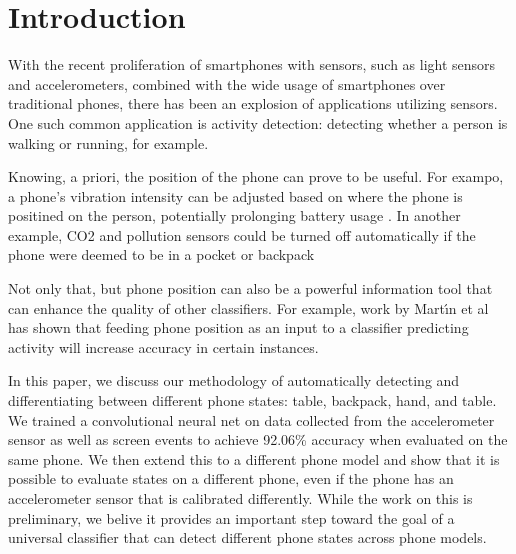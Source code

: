 \section{Introduction}
With the recent proliferation of smartphones with sensors, such as light sensors and accelerometers,
 combined with the wide usage of smartphones over traditional phones, 
 there has been an explosion of applications utilizing sensors.
One such common application is activity detection: detecting whether a person is walking or running, for example.

Knowing, a priori, the position of the phone can prove to be useful.
For exampo, a phone's vibration intensity can be adjusted based on where the phone is positined on the person, potentially prolonging battery usage \cite{Fujinami}.
In another example, CO2 and pollution sensors could be turned off automatically if the phone were deemed to be in a pocket or backpack \cite{Miluzzo2010} 

Not only that, but phone position can also be a powerful information tool that can enhance the quality of other classifiers.
For example, work by Mart\'{\i}n et al has shown that feeding phone position as an input to a classifier predicting activity will increase accuracy in certain instances\cite{Martin}.  


In this paper, we discuss our methodology of automatically detecting and differentiating between different phone states: table, backpack, hand, and table. 
We trained a convolutional neural net on data collected from the accelerometer sensor 
 as well as screen events to achieve 92.06\% accuracy when evaluated on the same phone.
We then extend this to a different phone model and show that it is possible to evaluate states on a 
 different phone, even if the phone has an accelerometer sensor that is calibrated differently.
While the work on this is preliminary, we belive it provides an important step toward the goal of a 
universal classifier that can detect different phone states across phone models. 

